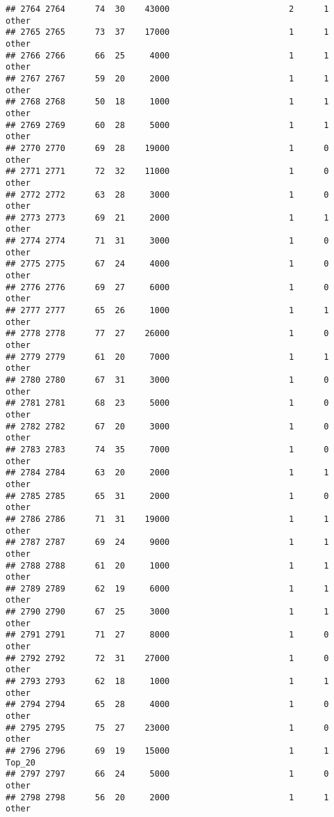 \documentclass[
]{article}
\begin{document}
\begin{verbatim}
## 2764 2764      74  30    43000                        2      1    other
## 2765 2765      73  37    17000                        1      1    other
## 2766 2766      66  25     4000                        1      1    other
## 2767 2767      59  20     2000                        1      1    other
## 2768 2768      50  18     1000                        1      1    other
## 2769 2769      60  28     5000                        1      1    other
## 2770 2770      69  28    19000                        1      0    other
## 2771 2771      72  32    11000                        1      0    other
## 2772 2772      63  28     3000                        1      0    other
## 2773 2773      69  21     2000                        1      1    other
## 2774 2774      71  31     3000                        1      0    other
## 2775 2775      67  24     4000                        1      0    other
## 2776 2776      69  27     6000                        1      0    other
## 2777 2777      65  26     1000                        1      1    other
## 2778 2778      77  27    26000                        1      0    other
## 2779 2779      61  20     7000                        1      1    other
## 2780 2780      67  31     3000                        1      0    other
## 2781 2781      68  23     5000                        1      0    other
## 2782 2782      67  20     3000                        1      0    other
## 2783 2783      74  35     7000                        1      0    other
## 2784 2784      63  20     2000                        1      1    other
## 2785 2785      65  31     2000                        1      0    other
## 2786 2786      71  31    19000                        1      1    other
## 2787 2787      69  24     9000                        1      1    other
## 2788 2788      61  20     1000                        1      1    other
## 2789 2789      62  19     6000                        1      1    other
## 2790 2790      67  25     3000                        1      1    other
## 2791 2791      71  27     8000                        1      0    other
## 2792 2792      72  31    27000                        1      0    other
## 2793 2793      62  18     1000                        1      1    other
## 2794 2794      65  28     4000                        1      0    other
## 2795 2795      75  27    23000                        1      0    other
## 2796 2796      69  19    15000                        1      1   Top_20
## 2797 2797      66  24     5000                        1      0    other
## 2798 2798      56  20     2000                        1      1    other

\end{verbatim}
\end{document}
